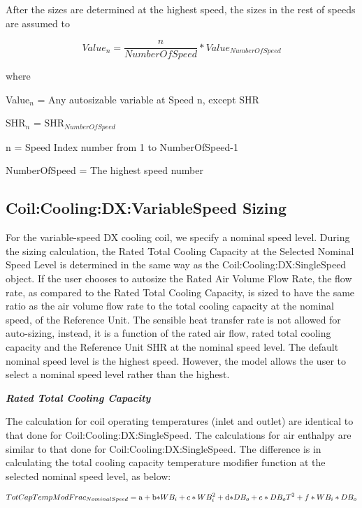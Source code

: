 After the sizes are determined at the highest speed, the sizes in the rest of speeds are assumed to

\begin{equation}
Valu{e_n} = \frac{n}{{NumberOfSpeed}}*Valu{e_{NumberOfSpeed}}
\end{equation}

where

Value\(_{n}\) = Any autosizable variable at Speed n, except SHR

SHR\(_{n}\) = SHR\(_{NumberOfSpeed}\)

n = Speed Index number from 1 to NumberOfSpeed-1

NumberOfSpeed = The highest speed number

\subsection{Coil:Cooling:DX:VariableSpeed Sizing}\label{coilcoolingdxvariablespeed-sizing}

For the variable-speed DX cooling coil, we specify a nominal speed level. During the sizing calculation, the Rated Total Cooling Capacity at the Selected Nominal Speed Level is determined in the same way as the Coil:Cooling:DX:SingleSpeed object. If the user chooses to autosize the Rated Air Volume Flow Rate, the flow rate, as compared to the Rated Total Cooling Capacity, is sized to have the same ratio as the air volume flow rate to the total cooling capacity at the nominal speed, of the Reference Unit. The sensible heat transfer rate is not allowed for auto-sizing, instead, it is a function of the rated air flow, rated total cooling capacity and the Reference Unit SHR at the nominal speed level. The default nominal speed level is the highest speed. However, the model allows the user to select a nominal speed level rather than the highest.

\textbf{\emph{Rated Total Cooling Capacity}}

The calculation for coil operating temperatures (inlet and outlet) are identical to that done for Coil:Cooling:DX:SingleSpeed. The calculations for air enthalpy are similar to that done for Coil:Cooling:DX:SingleSpeed\emph{.} The difference is in calculating the total cooling capacity temperature modifier function at the selected nominal speed level, as below:

\begin{equation}
TotCapTempModFra{c_{NominalSpeed}} = {\rm{a}} + {\rm{b*}}W{B_i} + c*WB_i^2 + {\rm{d*}}D{B_o} + e*D{B_o}{T^2} + f*W{B_i}*D{B_o}
\end{equation}

